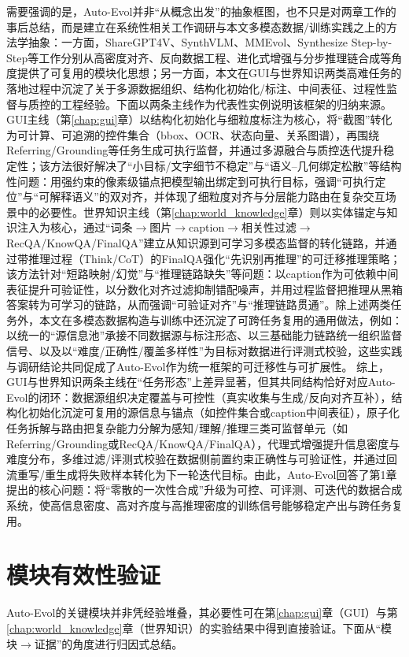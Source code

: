 需要强调的是，Auto-Evol并非“从概念出发”的抽象框图，也不只是对两章工作的事后总结，而是建立在系统性相关工作调研与本文多模态数据/训练实践之上的方法学抽象：一方面，ShareGPT4V、SynthVLM、MMEvol、Synthesize Step-by-Step等工作分别从高密度对齐、反向数据工程、进化式增强与分步推理链合成等角度提供了可复用的模块化思想\citep{chen2023sharegpt4v,liu2025synthvlm,xu2024mmevol,li2024synthesize}；另一方面，本文在GUI与世界知识两类高难任务的落地过程中沉淀了关于多源数据组织、结构化初始化/标注、中间表征、过程性监督与质控的工程经验。下面以两条主线作为代表性实例说明该框架的归纳来源。GUI主线（第\ref{chap:gui}章）以结构化初始化与细粒度标注为核心，将“截图”转化为可计算、可追溯的控件集合（bbox、OCR、状态向量、关系图谱），再围绕Referring/\allowbreak Grounding等任务生成可执行监督，并通过多源融合与质控迭代提升稳定性；该方法很好解决了“小目标/文字细节不稳定”与“语义--几何绑定松散”等结构性问题：用强约束的像素级锚点把模型输出绑定到可执行目标，强调“可执行定位”与“可解释语义”的双对齐，并体现了细粒度对齐与分层能力路由在复杂交互场景中的必要性。世界知识主线（第\ref{chap:world_knowledge}章）则以实体锚定与知识注入为核心，通过“词条$\rightarrow$图片$\rightarrow$caption$\rightarrow$相关性过滤$\rightarrow$RecQA/\allowbreak KnowQA/\allowbreak FinalQA”建立从知识源到可学习多模态监督的转化链路，并通过带推理过程（Think/CoT）的FinalQA强化“先识别再推理”的可迁移推理策略；该方法针对“短路映射/幻觉”与“推理链路缺失”等问题：以caption作为可依赖中间表征提升可验证性，以分数化对齐过滤抑制错配噪声，并用过程监督把推理从黑箱答案转为可学习的链路，从而强调“可验证对齐”与“推理链路贯通”。除上述两类任务外，本文在多模态数据构造与训练中还沉淀了可跨任务复用的通用做法，例如：以统一的“源信息池”承接不同数据源与标注形态、以三基础能力链路统一组织监督信号、以及以“难度/正确性/覆盖多样性”为目标对数据进行评测式校验，这些实践与调研结论共同促成了Auto-Evol作为统一框架的可迁移性与可扩展性。
综上，GUI与世界知识两条主线在“任务形态”上差异显著，但其共同结构恰好对应Auto-Evol的闭环：数据源组织决定覆盖与可控性（真实收集与生成/反向对齐互补），结构化初始化沉淀可复用的源信息与锚点（如控件集合或caption中间表征），原子化任务拆解与路由把复杂能力分解为感知/理解/推理三类可监督单元（如Referring/\allowbreak Grounding或RecQA/\allowbreak KnowQA/\allowbreak FinalQA），代理式增强提升信息密度与难度分布，多维过滤/评测式校验在数据侧前置约束正确性与可验证性，并通过回流重写/重生成将失败样本转化为下一轮迭代目标。由此，Auto-Evol回答了第1章提出的核心问题：将“零散的一次性合成”升级为可控、可评测、可迭代的数据合成系统，使高信息密度、高对齐度与高推理密度的训练信号能够稳定产出与跨任务复用。

\section{模块有效性验证}
Auto-Evol的关键模块并非凭经验堆叠，其必要性可在第\ref{chap:gui}章（GUI）与第\ref{chap:world_knowledge}章（世界知识）的实验结果中得到直接验证。下面从“模块$\rightarrow$证据”的角度进行归因式总结。

